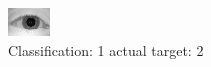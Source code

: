 \begin{figure}[h!]
\begin{center}
\includegraphics[width=0.60\columnwidth]{figures/ID933_class_1_target_2.png}
\end{center}
\caption{ Classification: 1 actual target: 2}
\label{fig:ID933_class_1_target_2}
\end{figure}
